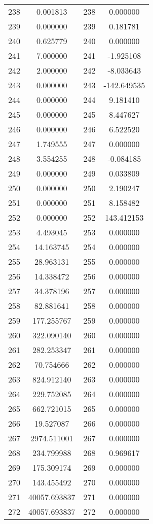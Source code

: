 \documentclass[12pt]{article}
\begin{document}
\begin{longtable}{@{}cccc@{}}
238 & 0.001813 & 238 & 0.000000 \\
239 & 0.000000 & 239 & 0.181781 \\
240 & 0.625779 & 240 & 0.000000 \\
241 & 7.000000 & 241 & -1.925108 \\
242 & 2.000000 & 242 & -8.033643 \\
243 & 0.000000 & 243 & -142.649535 \\
244 & 0.000000 & 244 & 9.181410 \\
245 & 0.000000 & 245 & 8.447627 \\
246 & 0.000000 & 246 & 6.522520 \\
247 & 1.749555 & 247 & 0.000000 \\
248 & 3.554255 & 248 & -0.084185 \\
249 & 0.000000 & 249 & 0.033809 \\
250 & 0.000000 & 250 & 2.190247 \\
251 & 0.000000 & 251 & 8.158482 \\
252 & 0.000000 & 252 & 143.412153 \\
253 & 4.493045 & 253 & 0.000000 \\
254 & 14.163745 & 254 & 0.000000 \\
255 & 28.963131 & 255 & 0.000000 \\
256 & 14.338472 & 256 & 0.000000 \\
257 & 34.378196 & 257 & 0.000000 \\
258 & 82.881641 & 258 & 0.000000 \\
259 & 177.255767 & 259 & 0.000000 \\
260 & 322.090140 & 260 & 0.000000 \\
261 & 282.253347 & 261 & 0.000000 \\
262 & 70.754666 & 262 & 0.000000 \\
263 & 824.912140 & 263 & 0.000000 \\
264 & 229.752085 & 264 & 0.000000 \\
265 & 662.721015 & 265 & 0.000000 \\
266 & 19.527087 & 266 & 0.000000 \\
267 & 2974.511001 & 267 & 0.000000 \\
268 & 234.799988 & 268 & 0.969617 \\
269 & 175.309174 & 269 & 0.000000 \\
270 & 143.455492 & 270 & 0.000000 \\
271 & 40057.693837 & 271 & 0.000000 \\
272 & 40057.693837 & 272 & 0.000000 \\

\end{longtable}
\end{document}
